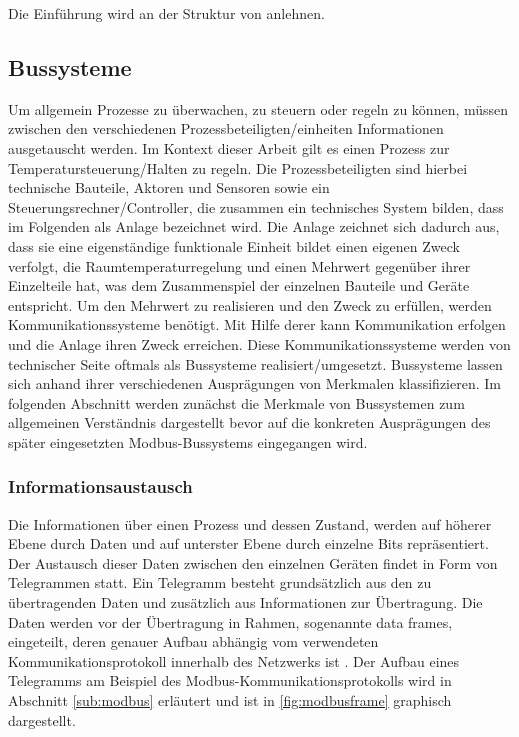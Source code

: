 Die Einführung wird an der Struktur von \cite{schn06} anlehnen.

\subsection{Bussysteme} 
Um allgemein Prozesse zu überwachen, zu steuern oder regeln zu können, müssen zwischen den verschiedenen Prozessbeteiligten/einheiten Informationen ausgetauscht werden. Im Kontext dieser Arbeit gilt es einen Prozess zur Temperatursteuerung/Halten zu regeln. Die Prozessbeteiligten sind hierbei technische Bauteile, Aktoren und Sensoren sowie ein Steuerungsrechner/Controller, die zusammen ein technisches System bilden, dass im Folgenden als Anlage bezeichnet wird. Die Anlage zeichnet sich dadurch aus, dass sie eine eigenständige funktionale Einheit bildet einen eigenen Zweck verfolgt, die Raumtemperaturregelung und einen Mehrwert gegenüber ihrer Einzelteile hat, was dem Zusammenspiel der einzelnen Bauteile und Geräte entspricht. 
Um den Mehrwert zu realisieren und den Zweck zu erfüllen, werden Kommunikationssysteme benötigt. Mit Hilfe derer kann Kommunikation erfolgen und die Anlage ihren Zweck erreichen.
Diese Kommunikationssysteme werden von technischer Seite oftmals als Bussysteme realisiert/umgesetzt.
Bussysteme lassen sich anhand ihrer verschiedenen Ausprägungen von Merkmalen klassifizieren. Im folgenden Abschnitt werden zunächst die Merkmale von Bussystemen zum allgemeinen Verständnis dargestellt bevor auf die konkreten Ausprägungen des später eingesetzten Modbus-Bussystems eingegangen wird.

\subsubsection{Informationsaustausch}

Die Informationen über einen Prozess und dessen Zustand, werden auf höherer Ebene durch Daten und auf unterster Ebene durch einzelne Bits repräsentiert. Der Austausch dieser Daten zwischen den einzelnen Geräten findet in Form von Telegrammen statt. Ein Telegramm besteht grundsätzlich aus den zu übertragenden Daten und zusätzlich aus Informationen zur Übertragung. Die Daten werden vor der Übertragung in Rahmen, sogenannte data frames, eingeteilt, deren genauer Aufbau abhängig vom verwendeten Kommunikationsprotokoll innerhalb des Netzwerks ist \cite[S.~11f.]{schn06}. Der Aufbau eines Telegramms am Beispiel des Modbus-Kommunikationsprotokolls wird in Abschnitt \ref{sub:modbus} erläutert und ist in \ref{fig:modbusframe} graphisch dargestellt.

